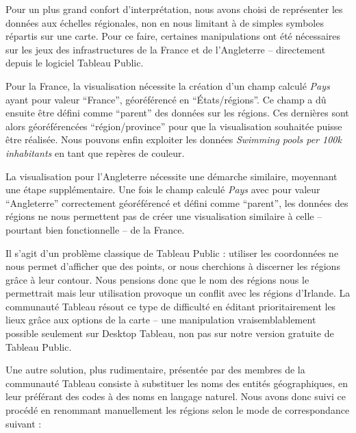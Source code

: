 \documentclass[hidelinks, 12pt]{report}
\begin{document}
Pour un plus grand confort d'interprétation, nous avons choisi de représenter les données aux échelles régionales, non en nous limitant à de simples symboles répartis sur une carte. Pour ce faire, certaines manipulations ont été nécessaires sur les jeux des infrastructures de la France et de l’Angleterre -- directement depuis le logiciel Tableau Public.

Pour la France, la visualisation nécessite la création d'un champ calculé \textit{Pays} ayant pour valeur \enquote{France}, géoréférencé en \enquote{États/régions}. Ce champ a dû ensuite être défini comme \enquote{parent} des données sur les régions. Ces dernières sont alors géoréférencées \enquote{région/province} pour que la visualisation souhaitée puisse être réalisée. Nous pouvons enfin exploiter les données \textit{Swimming pools per 100k inhabitants} en tant que repères de couleur.

La visualisation pour l'Angleterre nécessite une démarche similaire, moyennant une étape supplémentaire. Une fois le champ calculé \textit{Pays} avec pour valeur \enquote{Angleterre} correctement géoréférencé et défini comme \enquote{parent}, les données des régions ne nous permettent pas de créer une visualisation similaire à celle -- pourtant bien fonctionnelle -- de la France.

Il s'agit d'un problème classique de Tableau Public : utiliser les coordonnées ne nous permet d'afficher que des points, or nous cherchions à discerner les régions grâce à leur contour. Nous pensions donc que le nom des régions nous le permettrait mais leur utilisation provoque un conflit avec les régions d'Irlande. La communauté Tableau résout ce type de difficulté en éditant prioritairement les lieux grâce aux options de la carte -- une manipulation vraisemblablement possible seulement sur Desktop Tableau, non pas sur notre version gratuite de Tableau Public.

Une autre solution, plus rudimentaire, présentée par des membres de la communauté Tableau consiste à substituer les noms des entités géographiques, en leur préférant des codes à des noms en langage naturel. Nous avons donc suivi ce procédé en renommant manuellement les régions selon le mode de correspondance suivant :
\end{document}
